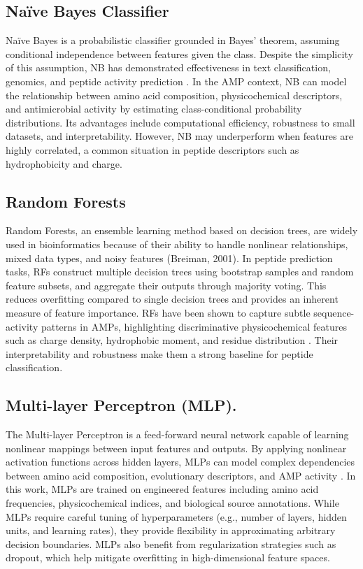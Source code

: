 \documentclass[a4paper,twoside,12pt]{book}
\begin{document}
\subsection{Naïve Bayes Classifier}
Naïve Bayes is a probabilistic classifier grounded in Bayes’ theorem, assuming conditional independence between features given the class. Despite the simplicity of this assumption, NB has demonstrated effectiveness in text classification, genomics, and peptide activity prediction \cite{bib:xiao2013}. In the AMP context, NB can model the relationship between amino acid composition, physicochemical descriptors, and antimicrobial activity by estimating class-conditional probability distributions. Its advantages include computational efficiency, robustness to small datasets, and interpretability. However, NB may underperform when features are highly correlated, a common situation in peptide descriptors such as hydrophobicity and charge.

\subsection{Random Forests}
Random Forests, an ensemble learning method based on decision trees, are widely used in bioinformatics because of their ability to handle nonlinear relationships, mixed data types, and noisy features (Breiman, 2001). In peptide prediction tasks, RFs construct multiple decision trees using bootstrap samples and random feature subsets, and aggregate their outputs through majority voting. This reduces overfitting compared to single decision trees and provides an inherent measure of feature importance. RFs have been shown to capture subtle sequence-activity patterns in AMPs, highlighting discriminative physicochemical features such as charge density, hydrophobic moment, and residue distribution \cite{bib:torres2018}. Their interpretability and robustness make them a strong baseline for peptide classification.

\subsection{Multi-layer Perceptron (MLP).}
The Multi-layer Perceptron is a feed-forward neural network capable of learning nonlinear mappings between input features and outputs. By applying nonlinear activation functions across hidden layers, MLPs can model complex dependencies between amino acid composition, evolutionary descriptors, and AMP activity \cite{bib:veltri2018}. In this work, MLPs are trained on engineered features including amino acid frequencies, physicochemical indices, and biological source annotations. While MLPs require careful tuning of hyperparameters (e.g., number of layers, hidden units, and learning rates), they provide flexibility in approximating arbitrary decision boundaries. MLPs also benefit from regularization strategies such as dropout, which help mitigate overfitting in high-dimensional feature spaces.
\end{document}
